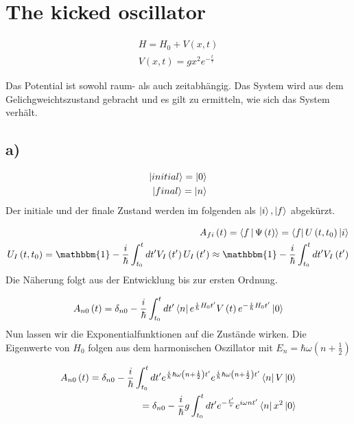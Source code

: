 \section{The kicked oscillator}

\begin{align}
H = H_0 + V \left( x,t \right) \\
V \left( x,t \right) = gx^2 e^{-\frac{t}{\tau}}
\end{align}

Das Potential ist sowohl raum- als auch zeitabh\"angig. Das System wird aus dem Gelichgweichtszustand gebracht und es gilt zu ermitteln, wie sich das System verh\"alt.

\subsection{a)}

\begin{align}
\Ket{initial} = \Ket{0} \\
\Ket{final} = \Ket{n}
\end{align}
Der initiale und der finale Zustand werden im folgenden als $\Ket{i}, \Ket{f}$ abgek\"urzt.

\begin{align}
A_{fi} \left( t \right) = \Braket{f | \Psi \left(t \right)} = \Bra{f} U \left( t, t_0 \right) \Ket{i} \\
U_I \left(t,t_0 \right) = \mathbbm{1} - \frac{i}{\hbar} \int_{t_0}^t dt' V_I \left(t' \right) U_I  \left(t' \right)
\approx \mathbbm{1} - \frac{i}{\hbar} \int_{t_0}^t dt' V_I \left(t' \right)
\end{align}
Die N\"aherung folgt aus der Entwicklung bis zur ersten Ordnung.

\begin{align}
A_{n0} \left( t \right) = \delta_{n0} -\frac{i}{\hbar} \int_{t_0}^t dt' \Bra{n} e^{\frac{i}{\hbar} H_0 t'} V \left( t \right) e^{-\frac{i}{\hbar} H_0 t'} \Ket{0}
\end{align}
Nun lassen wir die Exponentialfunktionen auf die Zust\"ande wirken. Die Eigenwerte von $H_0$ folgen aus dem harmonischen Oszillator mit $E_n = \hbar \omega \left( n + \frac{1}{2} \right)$

\begin{align}
A_{n0} \left( t \right) = \delta_{n0} -\frac{i}{\hbar} \int_{t_0}^t dt' e^{\frac{i}{\hbar} \hbar \omega \left( n + \frac{1}{2} \right) t'} e^{\frac{i}{\hbar} \hbar \omega \left( n + \frac{1}{2} \right) t'} \Bra{n} V \Ket{0} \\
= \delta_{n0} -\frac{i}{\hbar} g \int_{t_0}^t dt' e^{-\frac{t'}{\tau}} e^{i \omega n t'} \Bra{n} x^2 \Ket{0}
\end{align}

